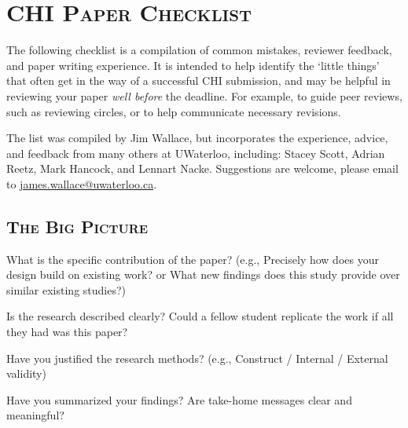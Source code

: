 

\newenvironment{checklist}{%
  \begin{list}{}{}%
  \let\olditem\item
  \renewcommand\item{\olditem[$\Box$] }
}{%
  \end{list}
}


\section*{\textsc{CHI Paper Checklist}}
The following checklist is a compilation of common mistakes, reviewer feedback, and paper writing experience. It is intended to help identify the `little things' that often get in the way of a successful CHI submission, and may be helpful in reviewing your paper \textit{well before} the deadline. For example, to guide peer reviews, such as reviewing circles, or to help communicate necessary revisions. 

The list was compiled by Jim Wallace, but incorporates the experience, advice, and feedback from many others at UWaterloo, including: Stacey Scott, Adrian Reetz, Mark Hancock, and Lennart Nacke. Suggestions are welcome, please email to \href{mailto:james.wallace@uwaterloo.ca}{james.wallace@uwaterloo.ca}. 


\noindent\makebox[\linewidth]{\rule{\linewidth}{0.4pt}}
\subsection*{\textsc{The Big Picture}}
\vspace{0.5cm}
\begin{checklist}
	\item What is the specific contribution of the paper? (e.g., Precisely how does your design build on existing work? or What new findings does this study provide over similar existing studies?)
	\item Is the research described clearly? Could a fellow student replicate the work if all they had was this paper?  
	\item Have you justified the research methods? (e.g., Construct / Internal / External validity)
	
	\item Have you summarized your findings? Are take-home messages clear and meaningful? 
\end{checklist}


